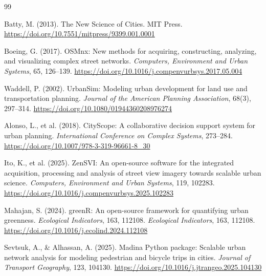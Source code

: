 \documentclass[final,3p,times]{elsarticle}
\begin{document}

\begin{thebibliography}{99}

Batty, M. (2013). The New Science of Cities. MIT Press. \href{https://doi.org/10.7551/mitpress/9399.001.0001}{https://doi.org/10.7551/mitpress/9399.001.0001}

Boeing, G. (2017). OSMnx: New methods for acquiring, constructing, analyzing, and visualizing complex street networks. \textit{Computers, Environment and Urban Systems}, 65, 126--139. \href{https://doi.org/10.1016/j.compenvurbsys.2017.05.004}{https://doi.org/10.1016/j.compenvurbsys.2017.05.004}

Waddell, P. (2002). UrbanSim: Modeling urban development for land use and transportation planning. \textit{Journal of the American Planning Association}, 68(3), 297--314. \href{https://doi.org/10.1080/01944360208976274}{https://doi.org/10.1080/01944360208976274}

Alonso, L., et al. (2018). CityScope: A collaborative decision support system for urban planning. \textit{International Conference on Complex Systems}, 273--284. \href{https://doi.org/10.1007/978-3-319-96661-8_30}{https://doi.org/10.1007/978-3-319-96661-8\_30}

Ito, K., et al. (2025). ZenSVI: An open-source software for the integrated acquisition, processing and analysis of street view imagery towards scalable urban science. \textit{Computers, Environment and Urban Systems}, 119, 102283. \href{https://doi.org/10.1016/j.compenvurbsys.2025.102283}{https://doi.org/10.1016/j.compenvurbsys.2025.102283}

Mahajan, S. (2024). greenR: An open-source framework for quantifying urban greenness. \textit{Ecological Indicators}, 163, 112108. \textit{Ecological Indicators}, 163, 112108. \href{https://doi.org/10.1016/j.ecolind.2024.112108}{https://doi.org/10.1016/j.ecolind.2024.112108}

Sevtsuk, A., \& Alhassan, A. (2025). Madina Python package: Scalable urban network analysis for modeling pedestrian and bicycle trips in cities. \textit{Journal of Transport Geography}, 123, 104130. \href{https://doi.org/10.1016/j.jtrangeo.2025.104130}{https://doi.org/10.1016/j.jtrangeo.2025.104130}


\end{thebibliography}
\end{document}
